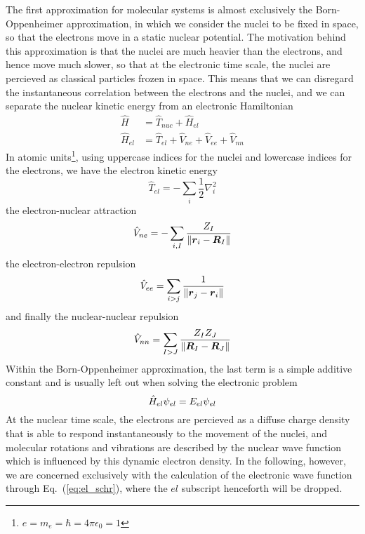The first approximation for molecular systems is almost exclusively the Born-Oppenheimer 
approximation\cite{Born-Oppenheimer:1927}, in which we consider the nuclei to be fixed in space, 
so that the electrons move in a static nuclear potential. The motivation behind this 
approximation is that the nuclei are much heavier than the electrons, and hence move much 
slower, so that at the electronic time scale, the nuclei are percieved as classical particles 
frozen in space. This means that we can disregard the instantaneous correlation between the 
electrons and the nuclei, and we can separate the nuclear kinetic energy from an electronic 
Hamiltonian
\begin{align}
    \hat{H} &= \hat{T}_{nuc} + \hat{H}_{el}\\
    \hat{H}_{el} &= \hat{T}_{el} + \hat{V}_{ne} + \hat{V}_{ee} + \hat{V}_{nn}
\end{align}
In atomic units\footnote{$e=m_e=\hbar=4\pi\epsilon_0=1$}, using uppercase indices for the
nuclei and lowercase indices for the electrons, we have the electron kinetic energy
\begin{equation}
    \hat{T}_{el} = -\sum_i \frac{1}{2}\nabla_i^2
\end{equation}
the electron-nuclear attraction
\begin{equation}
    \hat{V}_{ne} = -\sum_{i,I} \frac{Z_I}{\|\boldsymbol r_i-\boldsymbol R_I\|}
\end{equation}
the electron-electron repulsion
\begin{equation}
    \hat{V}_{ee} = \sum_{i>j} \frac{1}{\|\boldsymbol r_j-\boldsymbol r_i\|}
\end{equation}
and finally the nuclear-nuclear repulsion
\begin{equation}
    \hat{V}_{nn} = \sum_{I>J} \frac{Z_IZ_J}{\|\boldsymbol R_I-\boldsymbol R_J\|}
\end{equation}
Within the Born-Oppenheimer approximation, the last term is a simple additive constant 
and is usually left out when solving the electronic problem
\begin{equation}
    \label{eq:el_schr}
    \hat{H}_{el}\psi_{el} = E_{el}\psi_{el}
\end{equation}
At the nuclear time scale, the electrons are percieved as a diffuse charge density that is
able to respond instantaneously to the movement of the nuclei, and molecular rotations and 
vibrations are described by the nuclear wave function which is influenced by this dynamic
electron density. In the following, however, we are concerned exclusively with the calculation 
of the electronic wave function through Eq.~(\ref{eq:el_schr}), where the $el$ subscript 
henceforth will be dropped.


